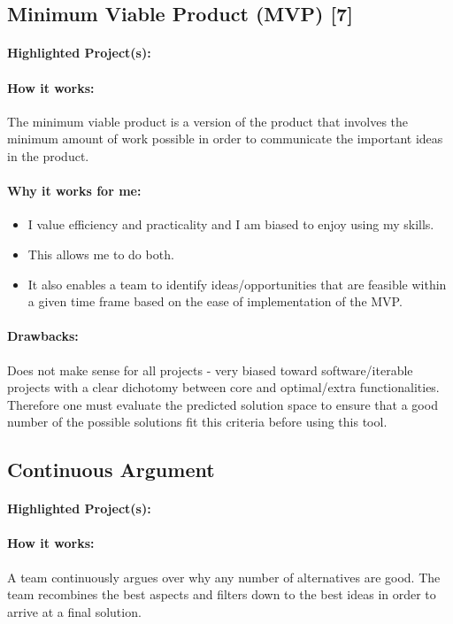 \documentclass[a4paper,12pt]{article}
\begin{document}
\subsection{Minimum Viable Product (MVP) [7]}
\paragraph{Highlighted Project(s): }
\paragraph{How it works: }
The minimum viable product is a version of the product that involves the minimum amount of work possible in order to communicate the important ideas in the product.

\paragraph{Why it works for me: }

\begin{itemize}
\item I value efficiency and practicality and I am biased to enjoy using my skills.
\item This allows me to do both.
\item It also enables a team to identify ideas/opportunities that are feasible within a given time frame based on the ease of implementation of the MVP.
\end{itemize}

\paragraph{Drawbacks: }
Does not make sense for all projects - very biased toward software/iterable projects with a clear dichotomy between core and optimal/extra functionalities. Therefore one must evaluate the predicted solution space to ensure that a good number of the possible solutions fit this criteria before using this tool.

\subsection{Continuous Argument}
\paragraph{Highlighted Project(s): }
\paragraph{How it works: }
A team continuously argues over why any number of alternatives are good. The team recombines the best aspects and filters down to the best ideas in order to arrive at a final solution.
\end{document}
